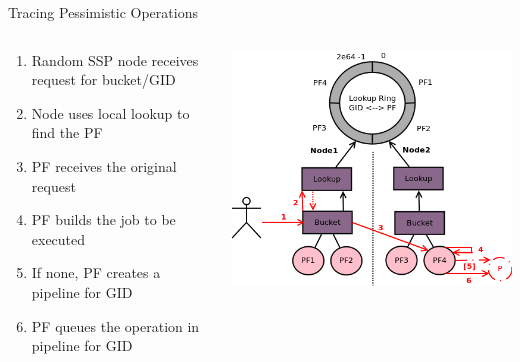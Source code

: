 \documentclass[aspectratio=169]{beamer}
\begin{document}
\begin{frame}{Tracing Pessimistic Operations}
    \begin{columns}
        \begin{column}[c]{0.6\textwidth}
            \begin{enumerate}
                \item Random SSP node receives request for bucket/GID
                \item Node uses local lookup to find the PF
                \item PF receives the original request
                \item PF builds the job to be executed
                \item If none, PF creates a pipeline for GID
                \item PF queues the operation in pipeline for GID
            \end{enumerate}
        \end{column}
        \begin{column}[c]{0.4\textwidth}
            \includegraphics[width=\textwidth]{images/tracingpessimistic.png}
        \end{column}
    \end{columns}
\end{frame}
\end{document}
